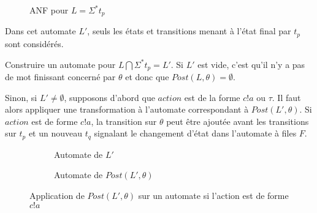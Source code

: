 \begin{figure}[H]
    \centering
    \caption{ANF pour $L=\Sigma^*t_p$}\label{fig:sigmatq}
\end{figure}


Dans cet automate $L'$, seuls les états et transitions menant à l'état final par $t_p$ sont considérés.

Construire un automate pour $L\bigcap\Sigma^*t_p=L'$. Si $L'$ est vide, c'est qu'il n'y a pas de mot finissant concerné par $\theta$ et donc que $Post(L,\theta)=\emptyset$.

Sinon, si $L'\neq\emptyset$, supposons d'abord que $action$ est de la forme $c!a$ ou $\tau$. Il faut alors appliquer une transformation à l'automate correspondant à $Post(L',\theta)$.
Si $action$ est de forme $c!a$, la transition sur $\theta$ peut être ajoutée avant les transitions sur $t_p$ et un nouveau $t_q$ signalant le changement d'état dans l'automate à files $F$.

\begin{figure}[H]
    \centering
    \begin{subfigure}{0.5\linewidth}
        \centering
        \caption{Automate de $L'$}
    \end{subfigure}\hfill
    \begin{subfigure}{0.5\linewidth}
        \centering
        \caption{Automate de $Post(L',\theta)$}
    \end{subfigure}
    \caption{Application de $Post(L',\theta)$ sur un automate si l'action est de forme $c!a$}
\end{figure}

